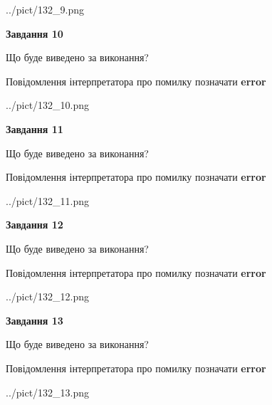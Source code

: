 \documentclass[11pt, ukrainian]{article}
\begin{document}
{\begin {large}
\begin{center}
	{../pict/132_9.png}
\end{center}
\newpage

{\begin {center}\textbf{Завдання 10}\end {center}}\par
Що буде виведено за виконання? \par
Повідомлення інтерпретатора про помилку позначати \textbf{error}

\begin{center}
	{../pict/132_10.png}
\end{center}
\newpage

{\begin {center}\textbf{Завдання 11}\end {center}}\par
Що буде виведено за виконання? \par
Повідомлення інтерпретатора про помилку позначати \textbf{error}

\begin{center}
	{../pict/132_11.png}
\end{center}
\newpage

{\begin {center}\textbf{Завдання 12}\end {center}}\par
Що буде виведено за виконання? \par
Повідомлення інтерпретатора про помилку позначати \textbf{error}

\begin{center}
	{../pict/132_12.png}
\end{center}
\newpage

{\begin {center}\textbf{Завдання 13}\end {center}}\par
Що буде виведено за виконання? \par
Повідомлення інтерпретатора про помилку позначати \textbf{error}

\begin{center}
	{../pict/132_13.png}
\end{center}
\newpage


\end{large}}
\end{document}
